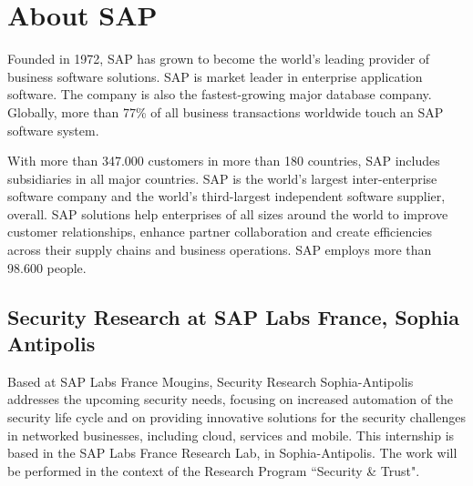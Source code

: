 \chapter*{About SAP}

Founded in 1972, SAP has grown to become the world's leading provider of business software solutions. SAP is market leader in enterprise application software. The company is also the fastest-growing major database company. Globally, more than 77\% of all business transactions worldwide touch an SAP software system.

With more than 347.000 customers in more than 180 countries, SAP includes subsidiaries in all major countries. SAP is the world's largest inter-enterprise software company and the world's third-largest independent software supplier, overall. SAP solutions help enterprises of all sizes around the world to improve customer relationships, enhance partner collaboration and create efficiencies across their supply chains and business operations. SAP employs more than 98.600 people.

\section*{Security Research at SAP Labs France, Sophia Antipolis} 

Based at SAP Labs France Mougins, Security Research Sophia-Antipolis\cite{sap} addresses the upcoming security needs, focusing on increased automation of the security life cycle and on providing innovative solutions for the security challenges in networked businesses, including cloud, services and mobile. This internship is based in the SAP Labs France Research Lab, in Sophia-Antipolis. The work will be performed in the context of the Research Program “Security {\&} Trust".